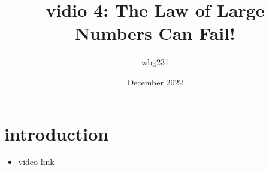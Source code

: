 \documentclass{article}
\title{vidio 4: The Law of Large Numbers Can Fail!}
\author{wbg231 }
\date{December 2022}
\begin{document}
\maketitle

\section{introduction}
\begin{itemize}
\item \href{https://www.youtube.com/watch?v=sqNtpYvqNfU&list=PLBEf5mJtE6KuZ5NBQMuWIMsiOOrV9ibzm&index=69}{video link}
\end{itemize}
\end{document}
